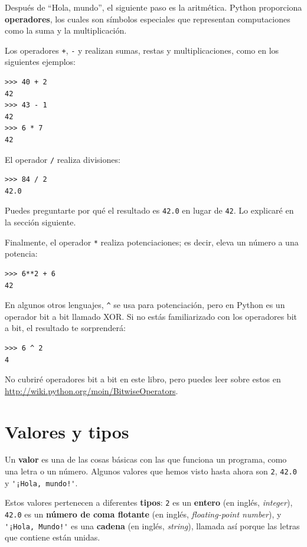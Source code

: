 \documentclass[10pt]{book}
\begin{document}
Después de ``Hola, mundo'', el siguiente paso es la aritmética.  Python
proporciona {\bf operadores}, los cuales son símbolos especiales que
representan computaciones como la suma y la multiplicación.

Los operadores {\tt +}, {\tt -} y {\tt *} realizan sumas,
restas y multiplicaciones, como en los siguientes ejemplos:

\begin{verbatim}
>>> 40 + 2
42
>>> 43 - 1
42
>>> 6 * 7
42
\end{verbatim}
%
El operador {\tt /} realiza divisiones:

\begin{verbatim}
>>> 84 / 2
42.0
\end{verbatim}
%
Puedes preguntarte por qué el resultado es {\tt 42.0} en lugar de {\tt 42}.
Lo explicaré en la sección siguiente.

Finalmente, el operador {\tt **} realiza potenciaciones; es decir,
eleva un número a una potencia:

\begin{verbatim}
>>> 6**2 + 6
42
\end{verbatim}
%
En algunos otros lenguajes, \verb"^" se usa para potenciación, pero
en Python es un operador bit a bit llamado XOR.  Si no estás familiarizado
con los operadores bit a bit, el resultado te sorprenderá:

\begin{verbatim}
>>> 6 ^ 2
4
\end{verbatim}
%
No cubriré
operadores bit a bit en este libro, pero puedes leer sobre
estos en \url{http://wiki.python.org/moin/BitwiseOperators}.


\section{Valores y tipos}

Un {\bf valor} es una de las cosas básicas con las que funciona un programa,
como una letra o un número.  Algunos valores que hemos visto hasta ahora son
{\tt 2}, {\tt 42.0} y \verb"'¡Hola, mundo!'".

Estos valores pertenecen a diferentes {\bf tipos}: {\tt 2} es un {\bf entero}
(en inglés, {\em integer}), {\tt 42.0} es un {\bf número de coma flotante} (en
inglés, {\em floating-point number}), y \verb"'¡Hola, Mundo!'" es una {\bf
cadena} (en inglés, {\em string}), llamada así porque las letras que contiene están unidas.
\end{document}
